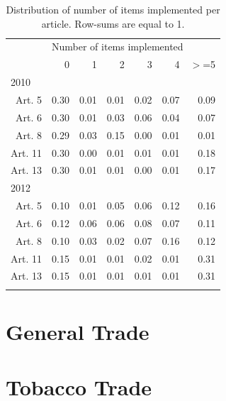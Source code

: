 \documentclass[10pt]{article}
\begin{document}
\begin{table}[ht]
\centering
\begin{tabular}{rrrrrrr}
  \toprule
&  \multicolumn{6}{l}{Number of items implemented}\\
 &  0 &  1 &  2 &  3 &  4 & $>$=5 \\ 
  \midrule
\multicolumn{6}{l}{2010}\\
Art. 5 & 0.30 & 0.01 & 0.01 & 0.02 & 0.07 & 0.09 \\ 
  Art. 6 & 0.30 & 0.01 & 0.03 & 0.06 & 0.04 & 0.07 \\ 
  Art. 8 & 0.29 & 0.03 & 0.15 & 0.00 & 0.01 & 0.01 \\ 
  Art. 11 & 0.30 & 0.00 & 0.01 & 0.01 & 0.01 & 0.18 \\ 
  Art. 13 & 0.30 & 0.01 & 0.01 & 0.00 & 0.01 & 0.17 \\ 
   \midrule
\multicolumn{6}{l}{2012}\\
Art. 5 & 0.10 & 0.01 & 0.05 & 0.06 & 0.12 & 0.16 \\ 
  Art. 6 & 0.12 & 0.06 & 0.06 & 0.08 & 0.07 & 0.11 \\ 
  Art. 8 & 0.10 & 0.03 & 0.02 & 0.07 & 0.16 & 0.12 \\ 
  Art. 11 & 0.15 & 0.01 & 0.01 & 0.02 & 0.01 & 0.31 \\ 
  Art. 13 & 0.15 & 0.01 & 0.01 & 0.01 & 0.01 & 0.31 \\ 
   \bottomrule
\multicolumn{6}{l}{}\\
\end{tabular}
\caption{Distribution of number of items implemented per article. Row-sums are equal to 1.} 
\end{table}

\pagebreak

\clearpage\section{General Trade}









\clearpage\section{Tobacco Trade}
\end{document}
